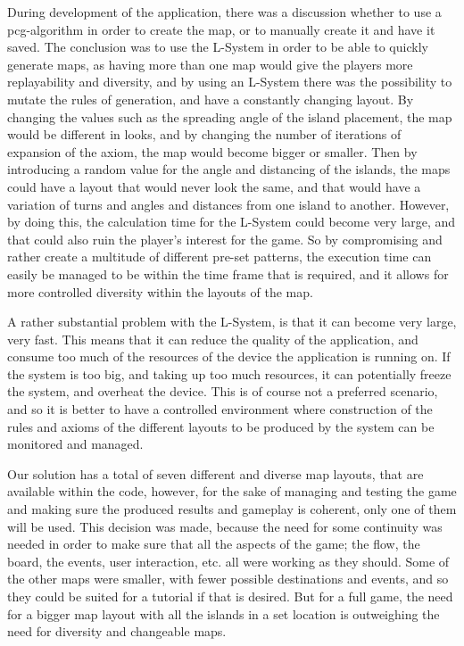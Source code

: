 During development of the application, there was a discussion whether to use a pcg-algorithm in order to create the map,
 or to manually create it and have it saved. The conclusion was to use the L-System in order to be able to quickly generate maps,
 as having more than one map would give the players more replayability and diversity, and by using an L-System there was 
 the possibility to mutate the rules of generation, and have a constantly changing layout. By changing the values such 
 as the spreading angle of the island placement, the map would be different in looks, and by changing the number of iterations 
 of expansion of the axiom, the map would become bigger or smaller. Then by introducing a random value for the angle and 
 distancing of the islands, the maps could have a layout that would never look the same, and that would have a variation of 
 turns and angles and distances from one island to another. However, by doing this, the calculation time for the L-System 
 could become very large, and that could also ruin the player's interest for the game. So by compromising and rather create a 
 multitude of different pre-set patterns, the execution time can easily be managed to be within the time frame that is required, 
 and it allows for more controlled diversity within the layouts of the map.

A rather substantial problem with the L-System, is that it can become very large, very fast. This means that it can reduce 
the quality of the application, and consume too much of the resources of the device the application is running on. 
If the system is too big, and taking up too much resources, it can potentially freeze the system, and overheat the device. 
This is of course not a preferred scenario, and so it is better to have a controlled environment where construction of the 
rules and axioms of the different layouts to be produced by the system can be monitored and managed.

Our solution has a total of seven different and diverse map layouts, that are available within the code, however, for the 
sake of managing and testing the game and making sure the produced results and gameplay is coherent, only one of them will 
be used. This decision was made, because the need for some continuity was needed in order to make sure that all the aspects 
of the game; the flow, the board, the events, user interaction, etc. all were working as they should. 
Some of the other maps were smaller, with fewer possible destinations and events, and so they could be suited for a tutorial 
if that is desired. But for a full game, the need for a bigger map layout with all the islands in a set location is outweighing 
the need for diversity and changeable maps.

